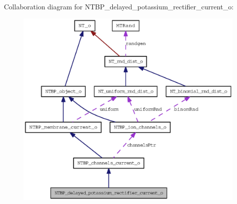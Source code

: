 Collaboration diagram for NTBP\_\-delayed\_\-potassium\_\-rectifier\_\-current\_\-o:
\nopagebreak
\begin{figure}[H]
\begin{center}
\leavevmode
\includegraphics[width=400pt]{class_n_t_b_p__delayed__potassium__rectifier__current__o__coll__graph}
\end{center}
\end{figure}
